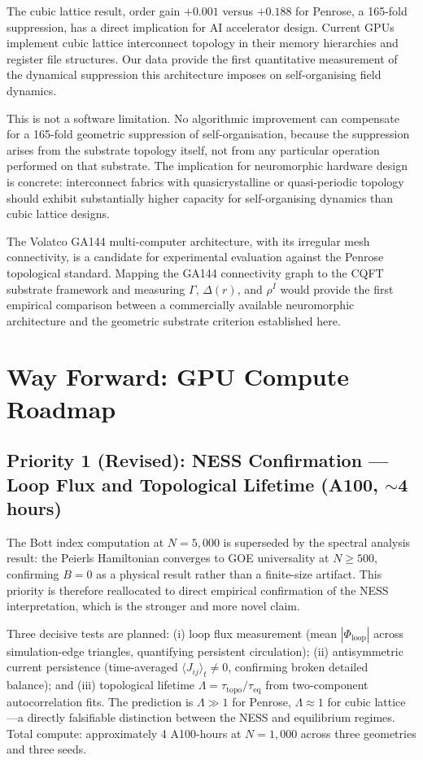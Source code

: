 \documentclass[11pt,a4paper]{article}
\begin{document}
The cubic lattice result, order gain $+0.001$ versus $+0.188$ for Penrose, a 165-fold suppression, has a direct implication for AI accelerator design. Current GPUs implement cubic lattice interconnect topology in their memory hierarchies and register file structures. Our data provide the first quantitative measurement of the dynamical suppression this architecture imposes on self-organising field dynamics.

This is not a software limitation. No algorithmic improvement can compensate for a 165-fold geometric suppression of self-organisation, because the suppression arises from the substrate topology itself, not from any particular operation performed on that substrate. The implication for neuromorphic hardware design is concrete: interconnect fabrics with quasicrystalline or quasi-periodic topology should exhibit substantially higher capacity for self-organising dynamics than cubic lattice designs.

The Volatco GA144 multi-computer architecture, with its irregular mesh connectivity, is a candidate for experimental evaluation against the Penrose topological standard. Mapping the GA144 connectivity graph to the CQFT substrate framework and measuring $\Gamma$, $\Delta(r)$, and $\rho^I$ would provide the first empirical comparison between a commercially available neuromorphic architecture and the geometric substrate criterion established here.

\section{Way Forward: GPU Compute Roadmap}

\subsection{Priority 1 (Revised): NESS Confirmation --- Loop Flux and Topological Lifetime (A100, $\sim$4 hours)}

The Bott index computation at $N = 5{,}000$ is superseded by the spectral analysis result: the Peierls Hamiltonian converges to GOE universality at $N \geq 500$, confirming $B = 0$ as a physical result rather than a finite-size artifact. This priority is therefore reallocated to direct empirical confirmation of the NESS interpretation, which is the stronger and more novel claim.

Three decisive tests are planned: (i) loop flux measurement (mean $|\Phi_{\text{loop}}|$ across simulation-edge triangles, quantifying persistent circulation); (ii) antisymmetric current persistence (time-averaged $\langle J_{ij}\rangle_t \neq 0$, confirming broken detailed balance); and (iii) topological lifetime $\Lambda = \tau_{\text{topo}}/\tau_{\text{eq}}$ from two-component autocorrelation fits. The prediction is $\Lambda \gg 1$ for Penrose, $\Lambda \approx 1$ for cubic lattice---a directly falsifiable distinction between the NESS and equilibrium regimes. Total compute: approximately 4 A100-hours at $N = 1{,}000$ across three geometries and three seeds.
\end{document}
